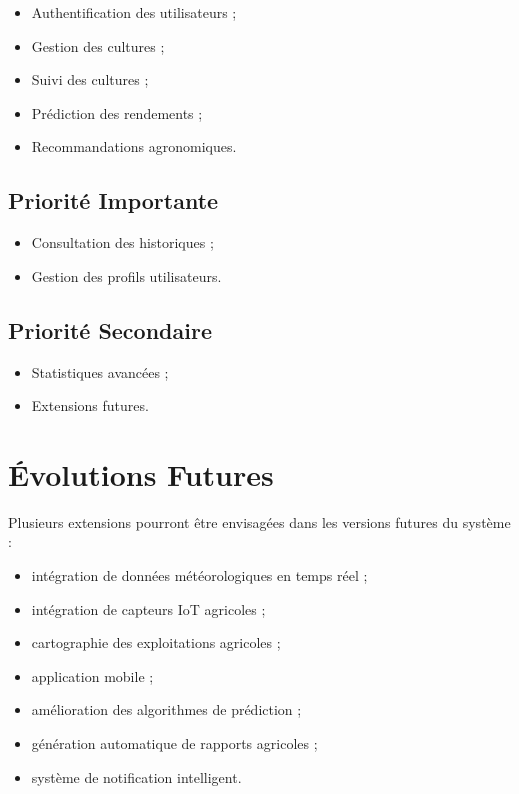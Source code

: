 \documentclass[12pt,a4paper]{report}
\begin{document}
\begin{itemize}
\item
  Authentification des utilisateurs ;
\item
  Gestion des cultures ;
\item
  Suivi des cultures ;
\item
  Prédiction des rendements ;
\item
  Recommandations agronomiques.
\end{itemize}

\subsection{Priorité Importante}\label{priorituxe9-importante}

\begin{itemize}
\item
  Consultation des historiques ;
\item
  Gestion des profils utilisateurs.
\end{itemize}

\subsection{Priorité Secondaire}\label{priorituxe9-secondaire}

\begin{itemize}
\item
  Statistiques avancées ;
\item
  Extensions futures.
\end{itemize}

\section{Évolutions Futures}\label{uxe9volutions-futures}

Plusieurs extensions pourront être envisagées dans les versions futures
du système :

\begin{itemize}
\item
  intégration de données météorologiques en temps réel ;
\item
  intégration de capteurs IoT agricoles ;
\item
  cartographie des exploitations agricoles ;
\item
  application mobile ;
\item
  amélioration des algorithmes de prédiction ;
\item
  génération automatique de rapports agricoles ;
\item
  système de notification intelligent.
\end{itemize}
\end{document}
